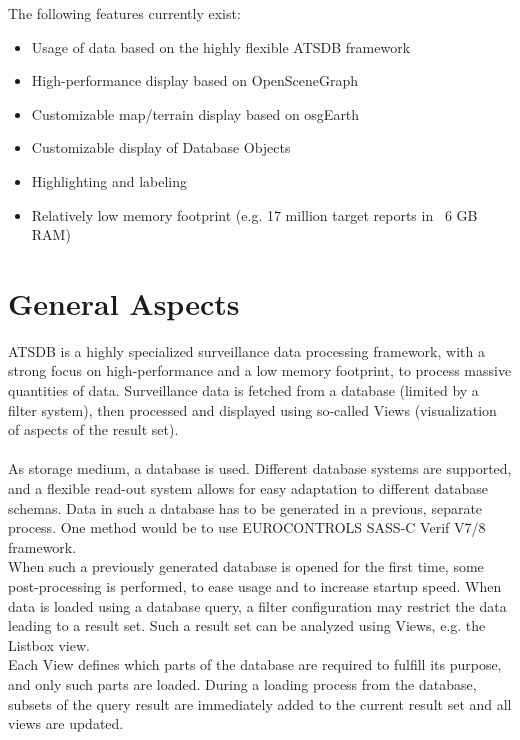 The following features currently exist:

\begin{itemize}  
\item Usage of data based on the highly flexible ATSDB framework
\item High-performance display based on OpenSceneGraph
\item Customizable map/terrain display based on osgEarth
\item Customizable display of Database Objects
\item Highlighting and labeling
\item Relatively low memory footprint (e.g. 17 million target reports in ~6 GB RAM)
\end{itemize}

\section{General Aspects}
ATSDB is a highly specialized surveillance data processing framework, with a strong focus on high-performance and a low memory footprint,  to process massive quantities of data. Surveillance data is fetched from a database (limited by a filter system), then processed and displayed using so-called Views (visualization of aspects of the result set).\\\\

As storage medium, a database is used.  Different database systems are supported, and a flexible read-out system allows for easy adaptation to different database schemas.  Data in such a database has to be generated in a previous, separate process.  One method would be to use EUROCONTROLS SASS-C  Verif V7/8 framework.\\

When such a previously generated database is opened for the first time, some post-processing is performed, to ease usage and to increase startup speed.  When data is loaded using a database query, a filter configuration may restrict the data leading to a result set.  Such a result set can be analyzed using Views, e.g. the Listbox view.\\

Each View defines which parts of the database are required to fulfill its purpose, and only such parts are loaded.  During a loading process from the database, subsets of the query result are immediately added to the current result set and all views are updated. 

